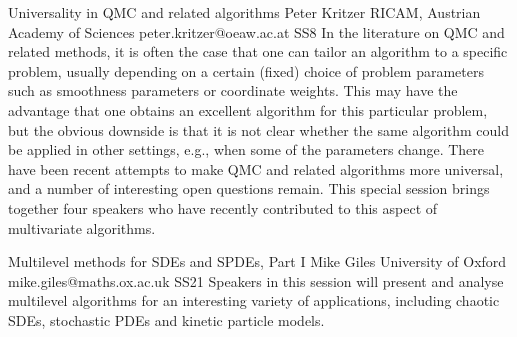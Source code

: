 \documentclass[12pt,a4paper,figuresright]{book}
\begin{document}








\begin{session}
 {Universality in QMC and related algorithms}%
 {Peter Kritzer}%
 {RICAM, Austrian Academy of Sciences}%
 {peter.kritzer@oeaw.ac.at}%
 {}%
 {}%
 {}%
 {SS8}%
 {}%
 In the literature on QMC and related methods, it is often the case that one can tailor an algorithm to a specific problem, usually depending on a certain (fixed) choice
 of problem parameters such as smoothness parameters or coordinate weights. This may
 have the advantage that one obtains an excellent algorithm for this particular problem,
 but the obvious downside is that it is not clear whether the same algorithm could be applied in other settings, e.g., when some of the parameters change. There have been recent attempts to make QMC and related algorithms more universal, and a number of interesting open questions remain. This special session brings together four speakers who have recently contributed to this aspect of multivariate algorithms.
\end{session}




\clearpage


\begin{session}
 {Multilevel methods for SDEs and SPDEs, Part I}%
 {Mike Giles}%
 {University of Oxford}%
 {mike.giles@maths.ox.ac.uk}%
 {}%
 {}%
 {}%
 {SS21}%
 {}%
 Speakers in this session will present and analyse multilevel algorithms for an interesting variety of applications, including chaotic SDEs, stochastic PDEs and kinetic particle models.
\end{session}
\end{document}
